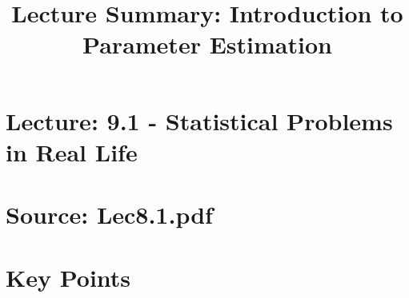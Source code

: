 \documentclass{article}
\title{Lecture Summary: Introduction to Parameter Estimation}
\author{}
\date{}
\begin{document}
\maketitle

\section*{Lecture: 9.1 - Statistical Problems in Real Life}
\section*{Source: Lec8.1.pdf}

\section*{Key Points}
\end{document}
